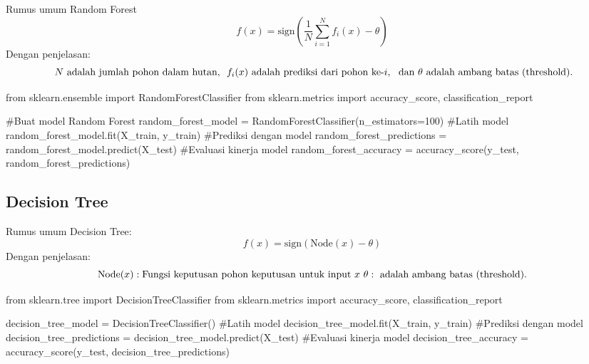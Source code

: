 \documentclass[
  letterpaper,
]{krantz}
\makeatletter
\newenvironment{Shaded}{\begin{snugshade}}{\end{snugshade}}
\newcommand{\CommentTok}[1]{\textcolor[rgb]{0.37,0.37,0.37}{#1}}
\newcommand{\DecValTok}[1]{\textcolor[rgb]{0.68,0.00,0.00}{#1}}
\newcommand{\ImportTok}[1]{\textcolor[rgb]{0.00,0.46,0.62}{#1}}
\newcommand{\NormalTok}[1]{\textcolor[rgb]{0.00,0.23,0.31}{#1}}
\newcommand{\OperatorTok}[1]{\textcolor[rgb]{0.37,0.37,0.37}{#1}}
\newenvironment{kframe}{%
\medskip{}
\setlength{\fboxsep}{.8em}
 \def\at@end@of@kframe{}%
 \ifinner\ifhmode%
  \def\at@end@of@kframe{\end{minipage}}%
  \begin{minipage}{\columnwidth}%
 \fi\fi%
 \def\FrameCommand##1{\hskip\@totalleftmargin \hskip-\fboxsep
 \colorbox{shadecolor}{##1}\hskip-\fboxsep
     \hskip-\linewidth \hskip-\@totalleftmargin \hskip\columnwidth}%
 \MakeFramed {\advance\hsize-\width
   \@totalleftmargin\z@ \linewidth\hsize
   \@setminipage}}%
 {\par\unskip\endMakeFramed%
 \at@end@of@kframe}
\renewenvironment{Shaded}{\begin{kframe}}{\end{kframe}}
\makeatother
\begin{document}
Rumus umum Random Forest
\[f(x) = \text{sign}\left(\frac{1}{N} \sum_{i=1}^{N} f_i(x) - \theta\right)
\] Dengan penjelasan:
\[\\\ N \text{ adalah jumlah pohon dalam hutan, } \\\ f_i(x) \text{ adalah prediksi dari pohon ke-} i,\\\ \text{ dan } \theta \text{ adalah ambang batas (threshold).}\]

\begin{Shaded}
\begin{Highlighting}[]
\ImportTok{from}\NormalTok{ sklearn.ensemble }\ImportTok{import}\NormalTok{ RandomForestClassifier}
\ImportTok{from}\NormalTok{ sklearn.metrics }\ImportTok{import}\NormalTok{ accuracy\_score, classification\_report}


\CommentTok{\#Buat model Random Forest}
\NormalTok{random\_forest\_model }\OperatorTok{=}\NormalTok{ RandomForestClassifier(n\_estimators}\OperatorTok{=}\DecValTok{100}\NormalTok{)}
\CommentTok{\#Latih model}
\NormalTok{random\_forest\_model.fit(X\_train, y\_train)}
\CommentTok{\#Prediksi dengan model}
\NormalTok{random\_forest\_predictions }\OperatorTok{=}\NormalTok{ random\_forest\_model.predict(X\_test)}
\CommentTok{\#Evaluasi kinerja model}
\NormalTok{random\_forest\_accuracy }\OperatorTok{=}\NormalTok{ accuracy\_score(y\_test, random\_forest\_predictions)}
\end{Highlighting}
\end{Shaded}

\hypertarget{decision-tree}{%
\subsection{Decision Tree}\label{decision-tree}}

Rumus umum Decision Tree: \[
f(x) = \text{sign}\left(\text{Node}(x) - \theta\right)
\] Dengan penjelasan: \[
\text{Node}(x):\text{Fungsi keputusan pohon keputusan untuk input } x
\\\ \theta: \text{ adalah ambang batas (threshold).}
\]

\begin{Shaded}
\begin{Highlighting}[]
\ImportTok{from}\NormalTok{ sklearn.tree }\ImportTok{import}\NormalTok{ DecisionTreeClassifier}
\ImportTok{from}\NormalTok{ sklearn.metrics }\ImportTok{import}\NormalTok{ accuracy\_score, classification\_report}

\NormalTok{decision\_tree\_model }\OperatorTok{=}\NormalTok{ DecisionTreeClassifier()}
\CommentTok{\#Latih model}
\NormalTok{decision\_tree\_model.fit(X\_train, y\_train)}
\CommentTok{\#Prediksi dengan model}
\NormalTok{decision\_tree\_predictions }\OperatorTok{=}\NormalTok{ decision\_tree\_model.predict(X\_test)}
\CommentTok{\#Evaluasi kinerja model}
\NormalTok{decision\_tree\_accuracy }\OperatorTok{=}\NormalTok{ accuracy\_score(y\_test, decision\_tree\_predictions)}
\end{Highlighting}
\end{Shaded}
\end{document}
